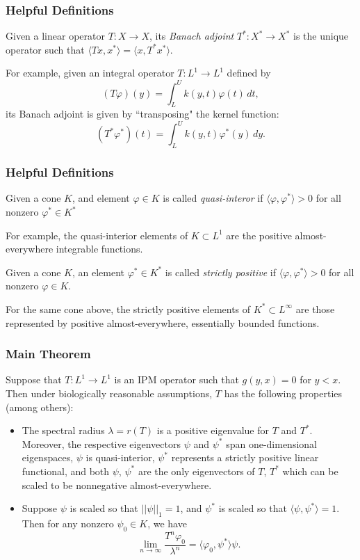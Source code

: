 \documentclass{beamer}
\begin{document}
\begin{frame}
	\frametitle{Helpful Definitions}
		\begin{definition}
			Given a linear operator $T:X \to X$, its \emph{Banach adjoint} $T^*:X^* \to X^*$ is the unique operator such that $\langle Tx, x^* \rangle = \langle x, T^*x^* \rangle$. 
		\end{definition}
	\pause
	For example, given an integral operator $T:L^1 \to L^1$ defined by
	\[(T\varphi)(y) = \int_L^U k(y, t) \varphi(t) \, dt,\]
	\pause
	its Banach adjoint is given by ``transposing" the kernel function:
	\[(T^*\varphi^*)(t) = \int_L^U k(y, t)\varphi^*(y) \, dy.\]
\end{frame}

\begin{frame}
	\frametitle{Helpful Definitions}
		\begin{definition}
			Given a cone $K$, and element $\varphi \in K$ is called \emph{quasi-interor} if $\langle \varphi, \varphi^* \rangle >0$ for all nonzero $\varphi^* \in K^*$
		\end{definition}
		\pause
		For example, the quasi-interior elements of $K \subset L^1$ are the positive almost-everywhere integrable functions.
		\pause
		\begin{definition}
			Given a cone $K$, an element $\varphi^* \in K^*$ is called \emph{strictly positive} if $\langle \varphi, \varphi^* \rangle > 0$ for all nonzero $\varphi \in K$.
		\end{definition}
		\pause
		For the same cone above, the strictly positive elements of $K^* \subset L^\infty$ are those represented by positive almost-everywhere, essentially bounded functions.
\end{frame}

\begin{frame}
	\frametitle{Main Theorem}
	\begin{theorem}[R., 2020]
		Suppose that $T:L^1 \to L^1$ is an IPM operator such that $g(y, x) = 0$ for $y < x$. Then under biologically reasonable assumptions, $T$ has the following properties (among others):
		\pause
		\begin{itemize}
			\item The spectral radius $\lambda = r(T)$ is a positive eigenvalue for $T$ and $T^*$. Moreover, the respective eigenvectors $\psi$ and $\psi^*$ span one-dimensional eigenspaces, $\psi$ is quasi-interior, $\psi^*$ represents a strictly positive linear functional, and both $\psi$, $\psi^*$ are the only eigenvectors of $T$, $T^*$ which can be scaled to be nonnegative almost-everywhere.
			\pause
			\item Suppose $\psi$ is scaled so that $||\psi||_1 = 1$, and $\psi^*$ is scaled so that $\langle \psi, \psi^* \rangle = 1$. Then for any nonzero $\psi_0 \in K$, we have
			\[\lim_{n \to \infty} \frac{T^n \varphi_0}{\lambda^n} = \langle \varphi_0, \psi^* \rangle \psi.\]			
		\end{itemize}
	\end{theorem}
\end{frame}
\end{document}
